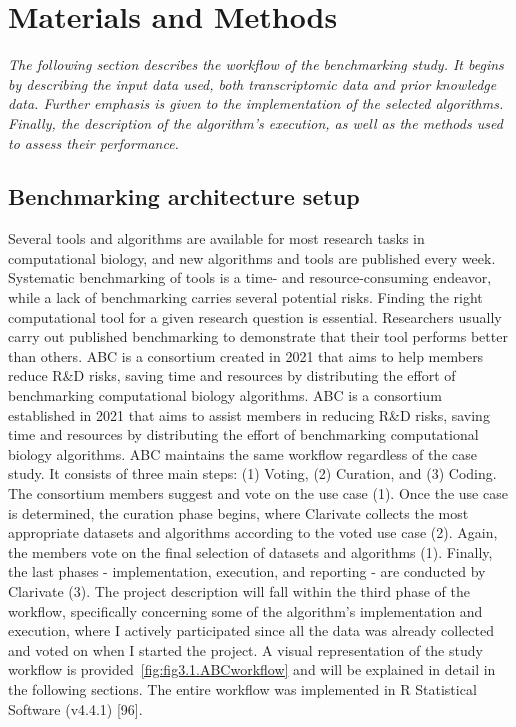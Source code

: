 ﻿%

%


\chapter{Materials and Methods}
\label{cha:materialsandmethods}


\textit{The following section describes the workflow of the benchmarking study. It begins by describing the input data used, both transcriptomic data and prior knowledge data. Further emphasis is given to the implementation of the selected algorithms. Finally, the description of the algorithm's execution, as well as the methods used to assess their performance.}


\section{Benchmarking architecture setup} %
\label{sec:benchmarkingarchitecturesetup}

Several tools and algorithms are available for most research tasks in computational biology, and new algorithms and tools are published every week. Systematic benchmarking of tools is a time- and resource-consuming endeavor, while a lack of benchmarking carries several potential risks. Finding the right computational tool for a given research question is essential. Researchers usually carry out published benchmarking to demonstrate that their tool performs better than others. ABC is a consortium created in 2021 that aims to help members reduce R\&D risks, saving time and resources by distributing the effort of benchmarking computational biology algorithms. ABC is a consortium established in 2021 that aims to assist members in reducing R\&D risks, saving time and resources by distributing the effort of benchmarking computational biology algorithms. ABC maintains the same workflow regardless of the case study. It consists of three main steps: (1) Voting, (2) Curation, and (3) Coding. The consortium members suggest and vote on the use case (1). Once the use case is determined, the curation phase begins, where Clarivate collects the most appropriate datasets and algorithms according to the voted use case (2). Again, the members vote on the final selection of datasets and algorithms (1). Finally, the last phases - implementation, execution, and reporting - are conducted by Clarivate (3). 
The project description will fall within the third phase of the workflow, specifically concerning some of the algorithm's implementation and execution, where I actively participated since all the data was already collected and voted on when I started the project. A visual representation of the study workflow is provided~\ref{fig:fig3.1.ABCworkflow} and will be explained in detail in the following sections. The entire workflow was implemented in \gls{R} Statistical Software (v4.4.1) [96].

